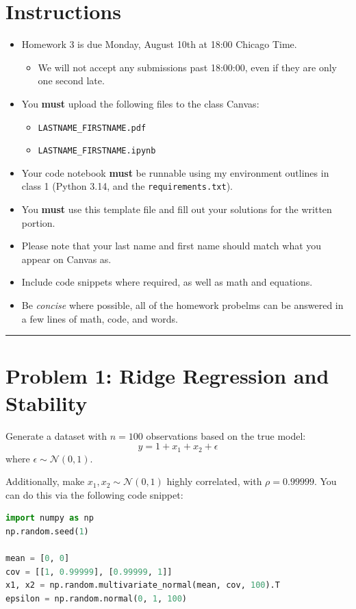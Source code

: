 \documentclass[11pt, letterpaper]{article}
\newcommand{\problem}[1]{\section*{Problem #1}}
\begin{document}
\section*{Instructions}
\begin{itemize}
    \item Homework 3 is due Monday, August 10th at 18:00 Chicago Time.
    \begin{itemize}
        \item We will not accept any submissions past 18:00:00, even if they are only one second late.
    \end{itemize}
    \item You \textbf{must} upload the following files to the class Canvas:
    \begin{itemize}
        \item \texttt{LASTNAME\_FIRSTNAME.pdf}
        \item \texttt{LASTNAME\_FIRSTNAME.ipynb}
    \end{itemize}
    \item Your code notebook \textbf{must} be runnable using my environment outlines in class 1 (Python 3.14, and the \texttt{requirements.txt}).
    \item You \textbf{must} use this template file and fill out your solutions for the written portion.
    \item Please note that your last name and first name should match what you appear on Canvas as.
    \item Include code snippets where required, as well as math and equations.
    \item Be \textit{concise} where possible, all of the homework probelms can be answered in a few lines of math, code, and words.
\end{itemize}
\hrule
\vspace{0.5cm}

\pagebreak

\problem{1: Ridge Regression and Stability}

Generate a dataset with $n=100$ observations based on the true model:
$$ y = 1 + x_1 + x_2 + \epsilon $$
where $\epsilon \sim \mathcal{N}(0, 1)$.

Additionally, make $x_1, x_2 \sim \mathcal{N}(0, 1)$ highly correlated, with $\rho = 0.99999$. You
can do this via the following code snippet:
    \begin{lstlisting}[language=Python]
import numpy as np
np.random.seed(1)

mean = [0, 0]
cov = [[1, 0.99999], [0.99999, 1]]
x1, x2 = np.random.multivariate_normal(mean, cov, 100).T
epsilon = np.random.normal(0, 1, 100)\end{lstlisting}
    
\end{document}
